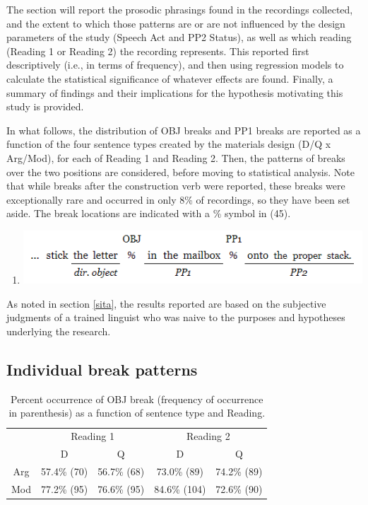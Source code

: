 \documentclass[12pt,oneside]{book}
\providecommand{\tightlist}{%
  \setlength{\itemsep}{0pt}\setlength{\parskip}{0pt}}
\begin{document}
The section will report the prosodic phrasings found in the recordings collected, and the extent to which those patterns are or are not influenced by the design parameters of the study (Speech Act and PP2 Status), as well as which reading (Reading 1 or Reading 2) the recording represents. This reported first descriptively (i.e., in terms of frequency), and then using regression models to calculate the statistical significance of whatever effects are found. Finally, a summary of findings and their implications for the hypothesis motivating this study is provided.

In what follows, the distribution of OBJ breaks and PP1 breaks are reported as a function of the four sentence types created by the materials design (D/Q x Arg/Mod), for each of Reading 1 and Reading 2. Then, the patterns of breaks over the two positions are considered, before moving to statistical analysis. Note that while breaks after the construction verb were reported, these breaks were exceptionally rare and occurred in only 8\% of recordings, so they have been set aside. The break locations are indicated with a \% symbol in (45).

\begin{enumerate}
\def\labelenumi{(\arabic{enumi})}
\setcounter{enumi}{44}
\tightlist
\item
  \includegraphics{breakpos.png}
\end{enumerate}

As noted in section \ref{sita}, the results reported are based on the subjective judgments of a trained linguist who was naive to the purposes and hypotheses underlying the research.

\hypertarget{individual-break-patterns}{%
\subsection{Individual break patterns}\label{individual-break-patterns}}

\begin{table}[!h]

\caption{\label{tab:obj}Percent occurrence of OBJ break (frequency of occurrence in parenthesis) as a function of sentence type and Reading.}
\centering
\begin{tabular}{ccccc}
\toprule
\multicolumn{1}{c}{ } & \multicolumn{2}{c}{Reading 1} & \multicolumn{2}{c}{Reading 2} \\
\cmidrule(l{3pt}r{3pt}){2-3} \cmidrule(l{3pt}r{3pt}){4-5}
 & D & Q & D & Q\\
\midrule
Arg & 57.4\% (70) & 56.7\% (68) & 73.0\% (89) & 74.2\% (89)\\
Mod & 77.2\% (95) & 76.6\% (95) & 84.6\% (104) & 72.6\% (90)\\
\bottomrule
\end{tabular}
\end{table}
\end{document}
